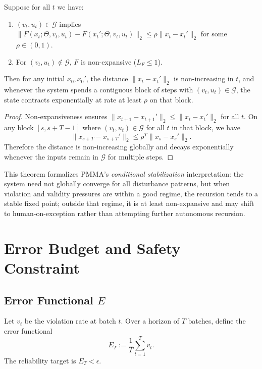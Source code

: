 \documentclass[11pt]{article}
\begin{document}
\begin{theorem}
\label{thm:conditional-stab}
Suppose for all $t$ we have:
\begin{enumerate}
  \item $(v_t,u_t)\in\mathcal{G}$ implies $\|F(x_t;\Theta,v_t,u_t) - F(x_t';\Theta,v_t,u_t)\|_2 \le \rho \|x_t - x_t'\|_2$ for some $\rho \in (0,1)$.
  \item For $(v_t,u_t)\notin\mathcal{G}$, $F$ is non-expansive ($L_F \le 1$).
\end{enumerate}
Then for any initial $x_0,x_0'$, the distance $\|x_t - x_t'\|_2$ is non-increasing in $t$, and whenever the system spends a contiguous block of steps with $(v_t,u_t)\in\mathcal{G}$, the state contracts exponentially at rate at least $\rho$ on that block.
\end{theorem}

\begin{proof}
Non-expansiveness ensures $\|x_{t+1}-x_{t+1}'\|_2 \le \|x_t - x_t'\|_2$ for all $t$.
On any block $[s,s+T-1]$ where $(v_t,u_t)\in\mathcal{G}$ for all $t$ in that block, we have
\[
  \|x_{s+T} - x_{s+T}'\|_2 \le \rho^T \|x_s - x_s'\|_2.
\]
Therefore the distance is non-increasing globally and decays exponentially whenever the inputs remain in $\mathcal{G}$ for multiple steps.
\end{proof}

This theorem formalizes PMMA's \emph{conditional stabilization} interpretation: the system need not globally converge for all disturbance patterns, but when violation and validity pressures are within a good regime, the recursion tends to a stable fixed point; outside that regime, it is at least non-expansive and may shift to human-on-exception rather than attempting further autonomous recursion.

\section{Error Budget and Safety Constraint}

\subsection{Error Functional \texorpdfstring{$E$}{E}}

Let $v_t$ be the violation rate at batch $t$.
Over a horizon of $T$ batches, define the error functional
\[
  E_T := \frac{1}{T} \sum_{t=1}^T v_t.
\]
The reliability target is $E_T < \epsilon$.
\end{document}
